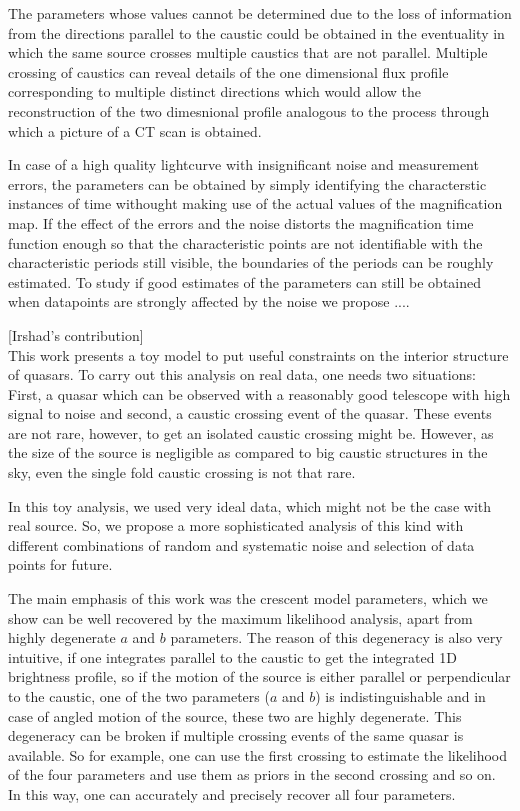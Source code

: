The parameters whose values cannot be determined due to the loss of information from the directions parallel to the caustic could be obtained in the eventuality in which the same source crosses multiple caustics that are not parallel. Multiple crossing of caustics can reveal details of the one dimensional flux profile corresponding to multiple distinct directions which would allow the reconstruction of the two dimesnional profile analogous to the process through which a picture of a CT scan is obtained.  

In case of a high quality lightcurve with insignificant noise and measurement errors, the parameters can be obtained by simply identifying the characterstic instances of time withought making use of the actual values of the magnification map. If the effect of the errors and the noise distorts the magnification time function enough so that the characteristic points are not identifiable with the characteristic periods still visible, the boundaries of the periods can be roughly estimated. To study if good estimates of the parameters can still be obtained when datapoints are strongly affected by the noise we propose ....        






              

[Irshad's contribution]\\

This work presents a toy model to put useful constraints on the interior structure of quasars. To carry out this analysis on real data, one needs two situations: First, a quasar which can be observed with a reasonably good telescope with high signal to noise and second, a caustic crossing event of the quasar. These events are not rare, however, to get an isolated caustic crossing might be. However, as the size of the source is negligible as compared to big caustic structures in the sky, even the single fold caustic crossing is not that rare.

In this toy analysis, we used very ideal data, which might not be the case with real source. So, we propose a more sophisticated analysis of this kind with different combinations of random and systematic noise and selection of data points for future.

The main emphasis of this work was the crescent model parameters, which we show can be well recovered by the maximum likelihood analysis, apart from highly degenerate $a$ and $b$ parameters. The reason of this degeneracy is also very intuitive, if one integrates parallel to the caustic to get the integrated 1D brightness profile, so if the motion of the source is either parallel or perpendicular to the caustic, one of the two parameters ($a$ and $b$) is indistinguishable and in case of angled motion of the source, these two are highly degenerate. This degeneracy can be broken if multiple crossing events of the same quasar is available. So for example, one can use the first crossing to estimate the likelihood of the four parameters and use them as priors in the second crossing and so on. In this way, one can accurately and precisely recover all four parameters.

